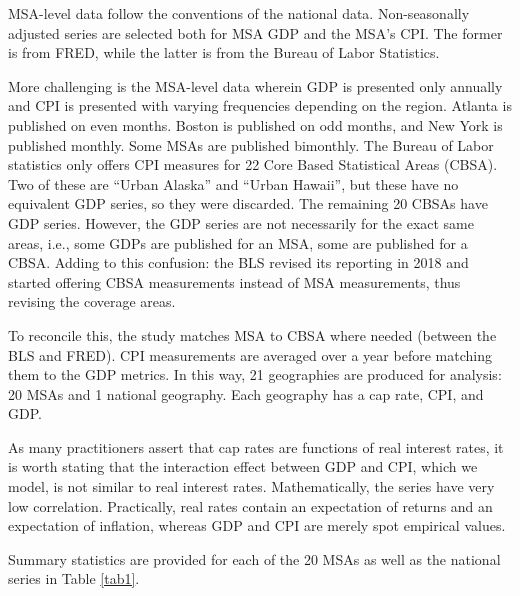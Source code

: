 \documentclass[jrfm,article,accept,oneauthor,pdftex]{Definitions/mdpi}
\begin{document}
MSA-level data follow the conventions of the national data. Non-seasonally adjusted series are selected both for MSA GDP and the MSA's CPI. The former is from FRED, while the latter is from the Bureau of Labor Statistics.

More challenging is the MSA-level data wherein GDP is presented only annually and CPI is presented with varying frequencies depending on the region. Atlanta is published on even months. Boston is published on odd months, and New York is published monthly. Some MSAs are published bimonthly. The Bureau of Labor statistics only offers CPI measures for 22 Core Based Statistical Areas (CBSA). Two of these are “Urban Alaska” and “Urban Hawaii”, but these have no equivalent GDP series, so they were discarded. The remaining 20 CBSAs have GDP series. However, the GDP series are not necessarily for the exact same areas, i.e., some GDPs are published for an MSA, some are published for a CBSA. Adding to this confusion: the BLS revised its reporting in 2018 and started offering CBSA measurements instead of MSA measurements, thus revising the coverage areas.

To reconcile this, the study matches MSA to CBSA where needed (between the BLS and FRED). CPI measurements are averaged over a year before matching them to the GDP metrics. In this way, 21 geographies are produced for analysis: 20 MSAs and 1 national geography. Each geography has a cap rate, CPI, and GDP. 

As many practitioners assert that cap rates are functions of real interest rates, it is worth stating that the interaction effect between GDP and CPI, which we model, is not similar to real interest rates. Mathematically, the series have very low correlation. Practically, real rates contain an expectation of returns and an expectation of inflation, whereas GDP and CPI are merely spot empirical values.

Summary statistics are provided for each of the 20 MSAs as well as the national series in Table \ref{tab1}.
\end{document}
